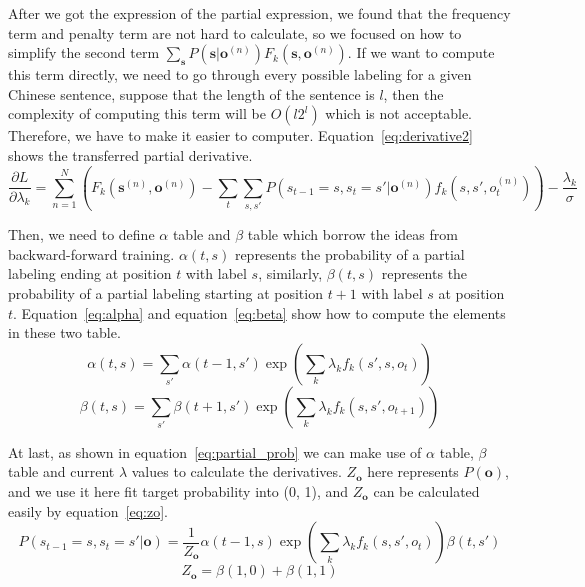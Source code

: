 \documentclass[UTF8,11pt]{article}
\begin{document}
After we got the expression of the partial expression, we found that the frequency term and penalty term are not hard to calculate, so we focused on how to simplify the second term $\sum_{\mathbf{s}} P( \mathbf{s} | \mathbf{o}^{(n)}) F_k ( \mathbf{s}, \mathbf{o}^{(n)} )$. If we want to compute this term directly, we need to go through every possible labeling for a given Chinese sentence, suppose that the length of the sentence is $l$, then the complexity of computing this term will be $O(l2^l)$ which is not acceptable. Therefore, we have to make it easier to computer. Equation~\ref{eq:derivative2} shows the transferred partial derivative.
\begin{equation} \label{eq:derivative2}
      \frac{\partial L}{\partial \lambda_k} = \sum_{n=1}^{N} \left( F_k ( \mathbf{s}^{(n)}, \mathbf{o}^{(n)} ) - \sum_t \sum_{s, s'}P(s_{t-1} = s, s_t = s' | \mathbf{o}^{(n)}) f_k(s, s', o^{(n)}_t) \right) - \frac{\lambda_k}{\sigma}
\end{equation}

Then, we need to define $\alpha$ table and $\beta$ table which borrow the ideas from backward-forward training. $\alpha(t, s)$ represents the probability of a partial labeling ending at position $t$ with label $s$, similarly, $\beta(t, s)$ represents the probability of a partial labeling starting at position $t+1$ with label $s$ at position $t$. Equation~\ref{eq:alpha} and equation~\ref{eq:beta} show how to compute the elements in these two table.
\begin{equation} \label{eq:alpha}
    \alpha(t, s) = \sum_{s'} \alpha(t-1, s') \exp \left( \sum_k \lambda_k f_k(s', s, o_t) \right)
\end{equation}
\begin{equation} \label{eq:beta}
    \beta(t, s) = \sum_{s'} \beta(t+1, s') \exp \left( \sum_k \lambda_k f_k(s, s', o_{t+1}) \right)
\end{equation}

At last, as shown in equation~\ref{eq:partial_prob} we can make use of $\alpha$ table, $\beta$ table and current $\lambda$ values to calculate the derivatives. $Z_{\mathbf{o}}$ here represents $P(\mathbf{o})$, and we use it here fit target probability into (0, 1), and $Z_{\mathbf{o}}$ can be calculated easily by equation~\ref{eq:zo}.
\begin{equation} \label{eq:partial_prob}
    P(s_{t-1} = s, s_{t} = s'|\mathbf{o}) = \frac{1}{Z_{\mathbf{o}}} \alpha(t-1, s) \exp \left( \sum_k \lambda_k f_k(s, s', o_t) \right) \beta(t, s')
\end{equation}
\begin{equation} \label{eq:zo}
     Z_{\mathbf{o}} = \beta(1, 0) + \beta(1, 1)
\end{equation}
\end{document}

